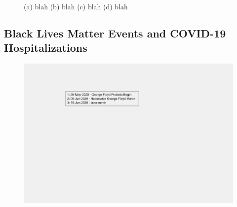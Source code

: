 \documentclass[]{article}
\begin{document}
\begin{figure}
	\caption{(a) blah (b) blah (c) blah (d) blah}
	\label{fig:foobar}
\end{figure}
\FloatBarrier
\vspace{5mm}


\subsection{Black Lives Matter Events and COVID-19 Hospitalizations}

\begin{figure}[!h]
	\includegraphics[width=\linewidth]{legends/BLM_legend.png}
	\caption{}
	\label{fig:legends/BLM_legendLabel}
\end{figure}
\end{document}
